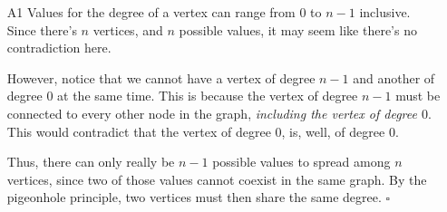 \documentclass[12pt]{article}
\begin{document}
\begin{itemize}
    \item[A1] Values for the degree of a vertex can range from $0$ to $n-1$ inclusive.
          Since there's $n$ vertices, and $n$ possible values, it may seem like there's no contradiction here.

          However, notice that we cannot have a vertex of degree $n-1$ and another of degree $0$ at the same time.
          This is because the vertex of degree $n-1$ must be connected to every other node in the graph,
          \textit{including the vertex of degree $0$}.
          This would contradict that the vertex of degree $0$, is, well, of degree $0$.

          Thus, there can only really be $n-1$ possible values to spread among $n$ vertices,
          since two of those values cannot coexist in the same graph.
          By the pigeonhole principle, two vertices must then share the same degree. $\square$
\end{itemize}
\end{document}
